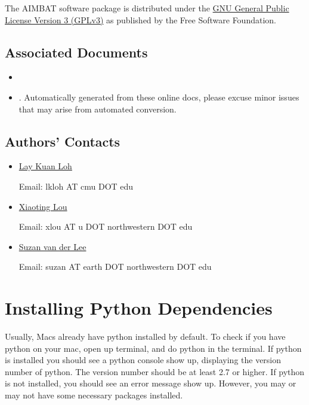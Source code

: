 \documentclass[letterpaper,10pt,english]{sphinxmanual}
\begin{document}
The AIMBAT software package is distributed under the \href{http://www.gnu.org/licenses/gpl.html}{GNU General Public License Version 3 (GPLv3)} as published by the Free Software Foundation.


\section{Associated Documents}
\label{docfiles/introduction:associated-documents}\begin{itemize}
\item {} 

\item {} 
. Automatically generated from these online docs, please excuse minor issues that may arise from automated conversion.

\end{itemize}


\section{Authors' Contacts}
\label{docfiles/introduction:authors-contacts}\label{docfiles/introduction:id5}\begin{itemize}
\item {} 
\href{http://lkloh2410.wordpress.com/}{Lay Kuan Loh}

Email: lkloh AT cmu DOT edu

\item {} 
\href{http://www.earth.northwestern.edu/~xlou/Welcome.html}{Xiaoting Lou}

Email: xlou AT u DOT northwestern DOT edu

\item {} 
\href{http://www.earth.northwestern.edu/research/suzan/}{Suzan van der Lee}

Email: suzan AT earth DOT northwestern DOT edu

\end{itemize}


\chapter{Installing Python Dependencies}
\label{docfiles/install_dependencies::doc}\label{docfiles/install_dependencies:installing-python-dependencies}
Usually, Macs already have python installed by default. To check if you have python on your mac, open up terminal, and do python in the terminal. If python is installed you should see a python console show up, displaying the version number of python. The version number should be at least 2.7 or higher. If python is not installed, you should see an error message show up. However, you may or may not have some necessary packages installed.
\end{document}
